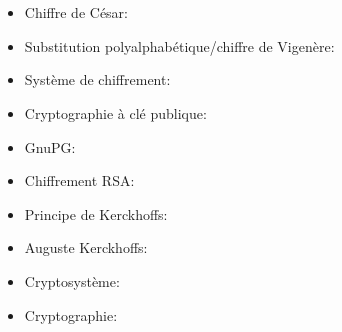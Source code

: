 {{\section*{\BrochureWebsitesAndKeywords}
{\raggedright
\begin{itemize}
  \item Chiffre de César: \href{https://fr.wikipedia.org/wiki/Chiffrement_par_d\%C3\%A9calage}{}
  \item Substitution polyalphabétique/chiffre de Vigenère: \href{https://fr.wikipedia.org/wiki/Chiffre_de_Vigen\%C3\%A8re}{}
  \item Système de chiffrement: \href{https://fr.wikipedia.org/wiki/Chiffrement}{}
  \item Cryptographie à clé publique: \href{https://fr.wikipedia.org/wiki/Cryptographie_asym\%C3\%A9trique}{}
  \item GnuPG: \href{https://fr.wikipedia.org/wiki/GNU_Privacy_Guard}{}
  \item Chiffrement RSA: \href{https://fr.wikipedia.org/wiki/Chiffrement_RSA}{}
  \item Principe de Kerckhoffs: \href{https://fr.wikipedia.org/wiki/Principe_de_Kerckhoffs}{}
  \item Auguste Kerckhoffs: \href{https://fr.wikipedia.org/wiki/Auguste_Kerckhoffs}{}
  \item Cryptosystème: \href{https://fr.wikipedia.org/wiki/Cryptosyst\%C3\%A8me}{}
  \item Cryptographie: \href{https://fr.wikipedia.org/wiki/Cryptographie}{}
\end{itemize}


}

}{}

}
